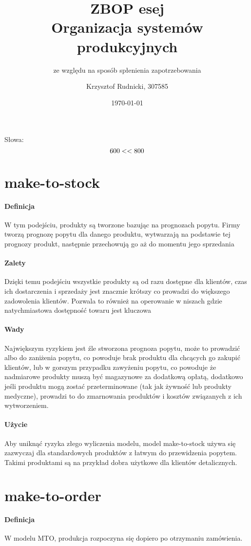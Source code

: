 \documentclass[12pt]{scrartcl}
\author{Krzysztof Rudnicki, 307585}
\title{ZBOP esej \\ Organizacja systemów produkcyjnych}
\subtitle{ze względu na sposób spłenienia zapotrzebowania}
\date{\today}
\newcommand\charcount{
    \immediate\write18{texcount esej.tex | grep "Words in text: " | cut -d: -f2 > esej.sum}
    
}
\begin{document}
	\maketitle
	Słowa:
	\[ 600 < \charcount < 800 \]
	\section{make-to-stock}
		\paragraph{Definicja} W tym podejściu, produkty są tworzone bazując na prognozach popytu. Firmy tworzą prognozę popytu dla danego produktu, wytwarzają na podstawie tej prognozy produkt, następnie przechowują go aż do momentu jego sprzedania
		\paragraph{Zalety} Dzięki temu podejściu wszystkie produkty są od razu dostępne dla klientów, czas ich dostarczenia i sprzedaży jest znacznie krótszy co prowadzi do większego zadowolenia klientów. Pozwala to również na operowanie w niszach gdzie natychmiastowa dostępność towaru jest kluczowa
		\paragraph{Wady} Największym ryzykiem jest źle stworzona prognoza popytu, może to prowadzić albo do zaniżenia popytu, co powoduje brak produktu dla chcących go zakupić klientów, lub w gorszym przypadku zawyżeniu popytu, co powoduje że nadmiarowe produkty muszą być magazynowe za dodatkową opłatą, dodatkowo jeśli produktu mogą zostać przeterminowane (tak jak żywność lub produkty medyczne), prowadzi to do zmarnowania produktów i kosztów związanych z ich wytworzeniem.
		\paragraph{Użycie} Aby uniknąć ryzyka złego wyliczenia modelu, model make-to-stock używa się zazwyczaj dla standardowych produktów z łatwym do przewidzenia popytem. Takimi produktami są na przykład dobra użytkowe dla klientów detalicznych.
		
	\section{make-to-order}
		\paragraph{Definicja} W modelu MTO, produkcja rozpoczyna się dopiero po otrzymaniu zamówienia. 
\end{document}
